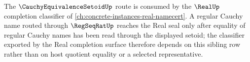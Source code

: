 \noindent
The $\CauchyEquivalenceSetoidUp$ route is consumed by the $\RealUp$ completion classifier of \autoref{ch:concrete-instances-real-namecert}. A regular Cauchy name routed through $\RegSeqRatUp$ reaches the Real seal only after equality of regular Cauchy names has been read through the displayed setoid; the classifier exported by the Real completion surface therefore depends on this sibling row rather than on host quotient equality or a selected representative.
